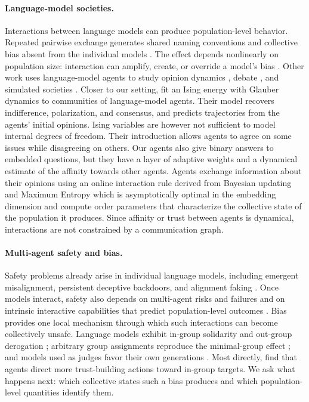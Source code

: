 \documentclass{article}
\begin{document}
\paragraph{Language-model societies.} Interactions between language models can
produce population-level behavior. Repeated pairwise exchange generates shared
naming conventions and collective bias absent from the individual models
\citep{ashery2025emergent}. The effect depends nonlinearly on population size:
interaction can amplify, create, or override a model's bias
\citep{flint2026groupsize}. Other work uses language-model agents to study opinion
dynamics \citep{chuang2024simulating,taubenfeld2024systematic}, debate
\citep{du2023debate}, and simulated societies \citep{park2023generative}. Closer to our setting, \citet{el2026physics} fit an Ising energy with Glauber
dynamics to communities of language-model agents. Their model
recovers indifference, polarization, and consensus, and predicts trajectories from
the agents' initial opinions. Ising variables are however not sufficient to model internal degrees of freedom. Their introduction allows agents to agree on some issues while disagreeing on others. Our agents also give binary answers to embedded questions, but they have a layer of adaptive weights and a dynamical estimate of the affinity towards other agents. Agents exchange information about their opinions using  an online interaction rule derived from Bayesian updating and Maximum Entropy which is asymptotically optimal in the embedding dimension and compute order parameters that characterize the collective state of the population it produces. Since affinity or trust between agents is dynamical, interactions are not constrained by a communication graph.

\paragraph{Multi-agent safety and bias.} Safety problems already arise in
individual language models, including emergent misalignment, persistent deceptive backdoors, and alignment faking
\citep{betley2025emergent,costa2026persona,hubinger2024sleeper,greenblatt2024alignment}.
Once models interact, safety also depends on multi-agent risks and failures and on
intrinsic interactive capabilities that predict population-level outcomes
\citep{hammond2025multiagent,cemri2025why,costa2025minimafia}. Bias provides one
local mechanism through which such
interactions can become collectively unsafe. Language models exhibit in-group
solidarity and out-group derogation \citep{hu2025social}; arbitrary group
assignments reproduce the minimal-group effect
\citep{tajfel1979integrative,lee2026minimal}; and models used as judges favor their
own generations \citep{panickssery2024evaluators,chen2025selfpreference}. Most
directly, \citet{lee2026ingroup} find that agents direct more trust-building
actions toward in-group targets. We ask what happens next: which collective states
such a bias produces and which population-level quantities identify them.
\end{document}
